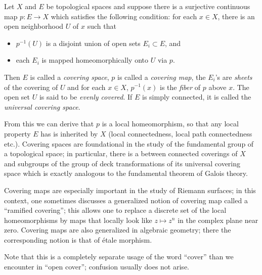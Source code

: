 \documentclass{article}
\begin{document}
Let $X$ and $E$ be topological spaces and suppose there is a surjective continuous map 
$p\colon E \rightarrow X$ which satisfies the following condition: for each $x \in X$, there is an open neighborhood $U$ of $x$ such that 
\begin{itemize}
\item $p^{-1}(U)$ is a disjoint union of open sets $E_{i} \subset E$, and 
\item each $E_{i}$ is mapped homeomorphically onto $U$ via $p$. 
\end{itemize}
Then $E$ is called a \emph{covering space}, $p$ is called a \emph{covering map}, the $E_{i}$'s are \emph{sheets} of the covering of $U$ and for each $x \in X$, $p^{-1}(x)$ is the \emph{fiber} of $p$ above $x$. The open set $U$ is said to be \emph{evenly covered}.
If $E$ is simply connected, it is called the \emph{universal covering space}.

From this we can derive that $p$ is a local homeomorphism, so that any local property $E$ 
has is inherited by $X$ (local connectedness, local path connectedness etc.). Covering spaces
are foundational in the study of the fundamental group of a topological space; in particular, there is a  between connected coverings of $X$ and subgroups of the group of deck transformations of its universal covering space which is exactly analogous to the fundamental theorem of Galois theory.

Covering maps are especially important in the study of Riemann surfaces; in this context, one sometimes discusses a generalized notion of covering map called a ``ramified covering''; this allows one to replace a discrete set of the local homeomorphisms by maps that locally look like $z\mapsto z^n$ in the complex plane near zero. Covering maps are also generalized in algebraic geometry; there the corresponding notion is that of \'etale morphism.


Note that this is a completely separate usage of the word ``cover'' than we encounter in ``open cover''; confusion usually does not arise.
\end{document}

